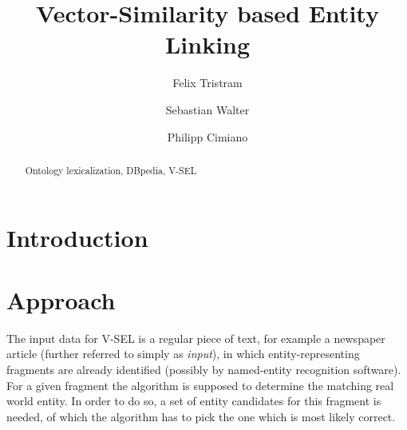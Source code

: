 \documentclass[runningheads,a4paper]{llncs}
\newcommand{\keywords}[1]{\par\addvspace\baselineskip
\noindent\keywordname\enspace\ignorespaces#1}
\begin{document}
\mainmatter  %

\newcommand{\acronym}{V-SEL}



\title{Vector-Similarity based Entity Linking}

\author{Felix Tristram \and Sebastian Walter \and Philipp Cimiano}



\maketitle


\begin{abstract}


\keywords{Ontology lexicalization, DBpedia, \acronym{}}
\end{abstract}

\section{Introduction}\label{sec:introduction}


\section{Approach}\label{sec:approach}
The input data for {\acronym} is a regular piece of text, for example a newspaper article (further referred to simply as \textit{input}), in which entity-representing fragments are already identified (possibly by named-entity recognition software). For a given fragment the algorithm is supposed to determine the matching real world entity. In order to do so, a set of entity candidates for this fragment is needed, of which the algorithm has to pick the one which is most likely correct. 
\end{document}

